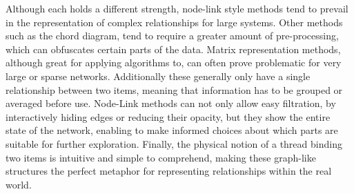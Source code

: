 Although each holds a different strength, node-link style methods tend to prevail in the representation of complex relationships for large systems. Other methods such as the chord diagram, tend to require a greater amount of pre-processing, which can obfuscates certain parts of the data. Matrix representation methods, although great for applying algorithms to, can often prove problematic for very large or sparse networks. Additionally these generally only have a single relationship between two items, meaning that information has to be grouped or averaged before use. Node-Link methods can not only allow easy filtration, by interactively hiding edges or reducing their opacity, but they show the entire state of the network, enabling to make informed choices about which parts are suitable for further exploration. Finally, the physical notion of a thread binding two items is intuitive and simple to comprehend, making these graph-like structures the perfect metaphor for representing relationships within the real world. 

